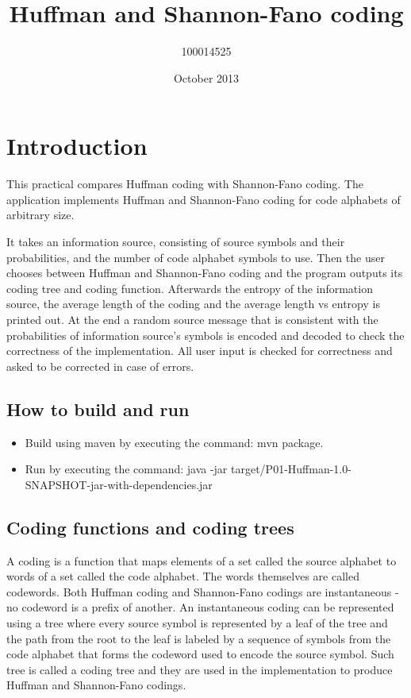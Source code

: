 \documentclass{article}
\title{Huffman and Shannon-Fano coding}
\author{100014525}
\date{October 2013}
\begin{document}
\maketitle

\section{Introduction}
This practical compares Huffman coding with Shannon-Fano coding. The application implements Huffman and Shannon-Fano coding for code alphabets of arbitrary size.

It takes an information source, consisting of source symbols and their probabilities, and the number of code alphabet symbols to use. Then the user chooses between Huffman and Shannon-Fano coding and the program outputs its coding tree and coding function. Afterwards the entropy of the information source, the average length of the coding and the average length vs entropy is printed out. At the end a random source message that is consistent with the probabilities of information source's symbols is encoded and decoded to check the correctness of the implementation. All user input is checked for correctness and asked to be corrected in case of errors.

\subsection{How to build and run}
\begin{itemize}
	\item Build using maven by executing the command: mvn package.
	\item Run by executing the command: java -jar target/P01-Huffman-1.0-SNAPSHOT-jar-with-dependencies.jar
\end{itemize}

\subsection{Coding functions and coding trees}
A coding is a function that maps elements of a set called the source alphabet to words of a set called the code alphabet. The words themselves are called codewords. Both Huffman coding and Shannon-Fano codings are instantaneous - no codeword is a prefix of another. An instantaneous coding can be represented using a tree where every source symbol is represented by a leaf of the tree and the path from the root to the leaf is labeled by a sequence of symbols from the code alphabet that forms the codeword used to encode the source symbol. Such tree is called a coding tree and they are used in the implementation to produce Huffman and Shannon-Fano codings.
\end{document}
